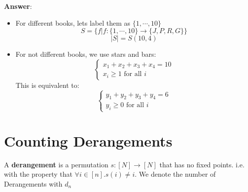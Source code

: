 \noindent \textbf{Answer}:
\begin{itemize}
    \item For different books, lets label them as $\{1,\cdots,10\}$
    $$S=\{f| f:\{1,\cdots,10\} \longrightarrow \{J,P,R,G\}\}$$
    $$|S|=S(10,4)$$
    \item For not different books, we use stars and bars:
    \begin{equation}
        \begin{cases}
            x_1+x_2+x_3+x_4 =10\\
            x_i \geq1 \text{ for all } i
        \end{cases}
    \end{equation}
    This is equivalent to:
    \begin{equation}
        \begin{cases}
            y_1+y_2+y_3+y_4=6\\
            y_i \geq 0 \text{ for all } i
        \end{cases}
    \end{equation}
\end{itemize}



\section{Counting Derangements}

\begin{definition}
    A \textbf{derangement} is a permutation $s:[N] \longrightarrow [N]$ that has no fixed points. 
    i.e. with the property that $\forall i \in[n]. s(i) \neq i$. 
    We denote the number of Derangements with $d_n$
\end{definition}

